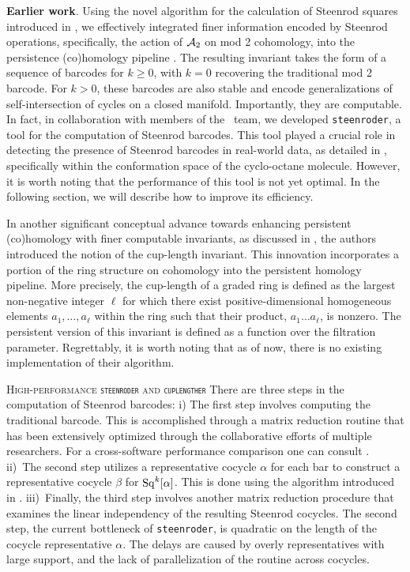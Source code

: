 \medskip\noindent\textbf{Earlier work}.
Using the novel algorithm for the calculation of Steenrod squares introduced in \cite{medina2023fast_sq}, we effectively integrated finer information encoded by Steenrod operations, specifically, the action of $\mathcal{A}_2$ on mod 2 cohomology, into the persistence (co)homology pipeline \cite{medina2022per_st}.
The resulting invariant takes the form of a sequence of barcodes for $k \geq 0$, with $k = 0$ recovering the traditional mod 2 barcode. For $k > 0$, these barcodes are also stable and encode generalizations of self-intersection of cycles on a closed manifold. Importantly, they are computable.
In fact, in collaboration with members of the \giottoTDA\ team, we developed \texttt{steenroder}, a tool for the computation of Steenrod barcodes.
This tool played a crucial role in detecting the presence of Steenrod barcodes in real-world data, as detailed in \cite{medina2022per_st}, specifically within the conformation space of the cyclo-octane molecule.
However, it is worth noting that the performance of this tool is not yet optimal.
In the following section, we will describe how to improve its efficiency.

In another significant conceptual advance towards enhancing persistent (co)homology with finer computable invariants, as discussed in \cite{memoli2022cup_length}, the authors introduced the notion of the cup-length invariant. This innovation incorporates a portion of the ring structure on cohomology into the persistent homology pipeline.
More precisely, the cup-length of a graded ring is defined as the largest non-negative integer $\ell$ for which there exist positive-dimensional homogeneous elements $a_1, \dots, a_\ell$ within the ring such that their product, $a_1 \dots a_\ell$, is nonzero. The persistent version of this invariant is defined as a function over the filtration parameter.
Regrettably, it is worth noting that as of now, there is no existing implementation of their algorithm.

\medskip\noindent\textsc{High-performance \texttt{steenroder} and \texttt{cuplengther}}
There are three steps in the computation of Steenrod barcodes:
i) The first step involves computing the traditional barcode. This is accomplished through a matrix reduction routine that has been extensively optimized through the collaborative efforts of multiple researchers.
For a cross-software performance comparison one can consult \cite{otter2017roadmap}.
ii)~The second step utilizes a representative cocycle $\alpha$ for each bar to construct a representative cocycle $\beta$ for $\operatorname{Sq}^k[\alpha]$.
This is done using the algorithm introduced in \cite{medina2023fast_sq}.
iii)~Finally, the third step involves another matrix reduction procedure that examines the linear independency of the resulting Steenrod cocycles.
The second step, the current bottleneck of \texttt{steenroder}, is quadratic on the length of the cocycle representative $\alpha$.
The delays are caused by overly representatives with large support, and the lack of parallelization of the routine across cocycles.

